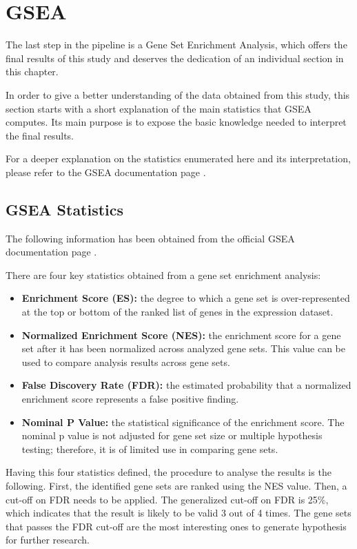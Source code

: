 \newpage
\section{GSEA}

The last step in the pipeline is a Gene Set Enrichment Analysis, which offers the final results of this study and deserves the dedication of an individual section in this chapter.

In order to give a better understanding of the data obtained from this study, this section starts with a short explanation of the main statistics that GSEA computes. Its main purpose is to expose the basic knowledge needed to interpret the final results.

For a deeper explanation on the statistics enumerated here and its interpretation, please refer to the GSEA documentation page \cite{gsea_user_doc:2012}.

\subsection{GSEA Statistics}

The following information has been obtained from the official GSEA documentation page \cite{gsea_user_doc:2012}.

There are four key statistics obtained from a gene set enrichment analysis:
\begin{itemize}
    \item \textbf{Enrichment Score (ES):} the degree to which a gene set is over-represented at the top or bottom of the ranked list of genes in the expression dataset.
    \item \textbf{Normalized Enrichment Score (NES):} the enrichment score for a gene set after it has been normalized across analyzed gene sets. This value can be used to compare analysis results across gene sets.
    \item \textbf{False Discovery Rate (FDR):} the estimated probability that a normalized enrichment score represents a false positive finding.
    \item \textbf{Nominal P Value:} the statistical significance of the enrichment score. The nominal p value is not adjusted for gene set size or multiple hypothesis testing; therefore, it is of limited use in comparing gene sets.
\end{itemize}

Having this four statistics defined, the procedure to analyse the results is the following. First, the identified gene sets are ranked using the NES value. Then, a cut-off on FDR needs to be applied. The generalized cut-off on FDR is 25\%, which indicates that the result is likely to be valid 3 out of 4 times. The gene sets that passes the FDR cut-off are the most interesting ones to generate hypothesis for further research.


